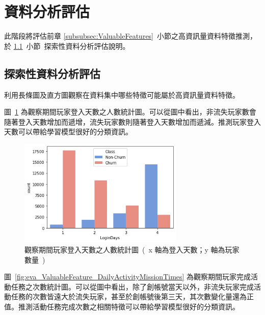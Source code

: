 \section{資料分析評估}
\label{sec:DataAnalysisEvaluation}

此階段將評估前章 \ref{subsubsec:ValuableFeatures}~小節之高資訊量資料特徵推測，於 \ref{subsec:EDAEvaluation}~小節\ 探索性資料分析評估說明。

\subsection{探索性資料分析評估}
\label{subsec:EDAEvaluation}

利用長條圖及直方圖觀察在資料集中哪些特徵可能屬於高資訊量資料特徵。

圖~\ref{fig:eva_ValuableFeature_LoginDays} 為觀察期間玩家登入天數之人數統計圖。可以從圖中看出，非流失玩家數會隨著登入天數增加而遞增，流失玩家數則隨著登入天數增加而遞減。推測玩家登入天數可以帶給學習模型很好的分類資訊。

\begin{figure}[!htb]
    \begin{center}
      \includegraphics[width=0.7\textwidth]{figures/evaluation/Image_LoginDays.png}
      \caption[觀察期間玩家登入天數之人數統計圖]{觀察期間玩家登入天數之人數統計圖\ (\ x 軸為登入天數；y 軸為玩家數量\ )\ }
      \label{fig:eva_ValuableFeature_LoginDays}
    \end{center}
\end{figure}
\newpage

圖~\ref{fig:eva_ValuableFeature_DailyActivityMissionTimes} 為觀察期間玩家完成活動任務之次數統計圖。可以從圖中看出，除了創帳號當天以外，非流失玩家完成活動任務的次數皆遠大於流失玩家，甚至於創帳號後第三天，其次數變化量還為正值。推測活動任務完成次數之相關特徵可以帶給學習模型很好的分類資訊。

